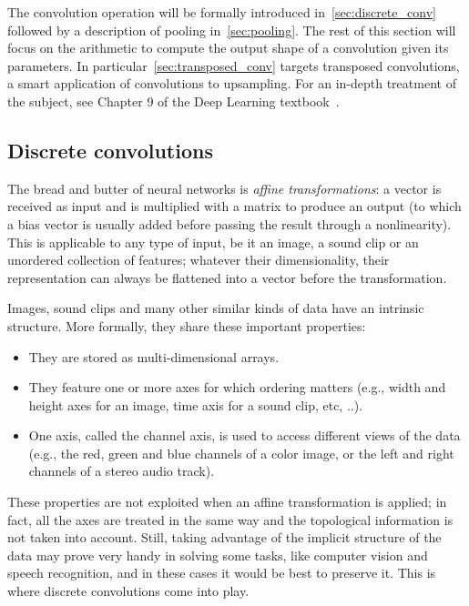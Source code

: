 The convolution operation will be formally introduced
in~\autoref{sec:discrete_conv} followed by a description of pooling
in~\autoref{sec:pooling}. The rest of this section will focus on the arithmetic
to compute the output shape of a convolution given its parameters. In
particular~\autoref{sec:transposed_conv} targets transposed convolutions, a
smart application of convolutions to upsampling. For an in-depth treatment of
the subject, see Chapter 9 of the Deep Learning
textbook~\citep{Goodfellow-et-al-2016-Book}.

\subsection{Discrete convolutions}\label{sec:discrete_conv}

The bread and butter of neural networks is \emph{affine transformations}: a
vector is received as input and is multiplied with a matrix to produce an
output (to which a bias vector is usually added before passing the result
through a nonlinearity). This is applicable to any type of input, be it an
image, a sound clip or an unordered collection of features; whatever their
dimensionality, their representation can always be flattened into a vector
before the transformation.

Images, sound clips and many other similar kinds of data have an intrinsic
structure. More formally, they share these important properties:

\begin{itemize}
    \item They are stored as multi-dimensional arrays.
    \item They feature one or more axes for which ordering matters (e.g., width
        and height axes for an image, time axis for a sound clip, etc, ..).
    \item One axis, called the channel axis, is used to access different views
        of the data (e.g., the red, green and blue channels of a color image, or
        the left and right channels of a stereo audio track).
\end{itemize}

These properties are not exploited when an affine transformation is applied; in
fact, all the axes are treated in the same way and the topological information
is not taken into account. Still, taking advantage of the implicit structure of
the data may prove very handy in solving some tasks, like computer vision and
speech recognition, and in these cases it would be best to preserve it. This is
where discrete convolutions come into play.

